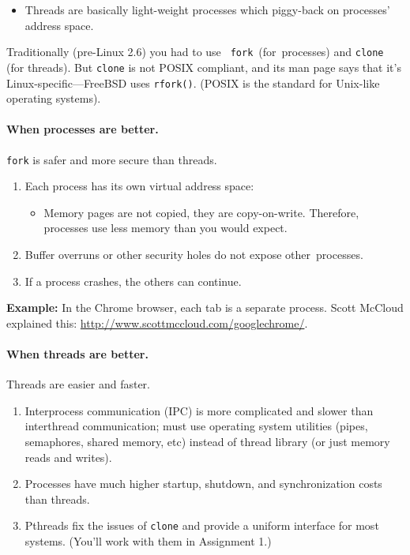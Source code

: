   \begin{itemize}
    \item Threads are basically light-weight processes which piggy-back on
          processes' address space.
  \end{itemize}

Traditionally (pre-Linux 2.6) you had to use {\tt
  fork}~(for~processes) and {\tt clone} (for threads). But {\tt clone}
is not POSIX compliant, and its man page says that it's
Linux-specific---FreeBSD uses {\tt rfork()}. (POSIX is the standard
for Unix-like operating systems).

\paragraph{When processes are better.} {\tt fork} is safer and more secure than threads.

  \begin{enumerate}
    \item Each process has its own virtual address space:
      \begin{itemize}
        \item Memory pages are not copied, they are copy-on-write. Therefore, processes use less memory than you would expect.
      \end{itemize}
    \item Buffer overruns or other security holes do not expose other~processes.
    \item If a process crashes, the others can continue.
  \end{enumerate}

{\bf Example:} In the Chrome browser, each tab is a separate
process. Scott McCloud explained this:
\url{http://www.scottmccloud.com/googlechrome/}.

\paragraph{When threads are better.} Threads are easier and faster.

  \begin{enumerate}
    \item Interprocess communication (IPC) is more complicated and slower than interthread
          communication; must use operating system utilities (pipes, semaphores, shared
              memory, etc) instead of thread library (or just memory reads and writes).
    \item Processes have much higher startup, shutdown, and synchronization costs than threads.
    \item Pthreads fix the issues of {\tt clone} and provide a
          uniform interface for most systems. (You'll work with them in Assignment 1.)
  \end{enumerate}

